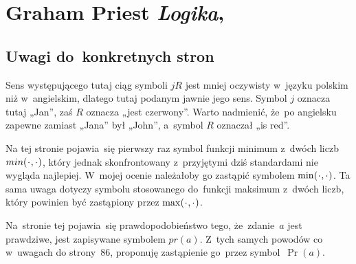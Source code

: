 \documentclass[a4paper,11pt]{article}
\numberwithin{equation}{section}
\begin{document}
\VerSpaceSix












\section{Graham Priest \textit{Logika},
  \parencite{Priest-Logika-Pub-2023}}



\subsection{Uwagi do~konkretnych stron}


\noindent
{} Sens występującego tutaj ciąg symboli $jR$ jest
mniej oczywisty w~języku polskim niż w~angielskim, dlatego tutaj podanym
jawnie jego sens. Symbol $j$ oznacza tutaj „Jan”, zaś $R$ oznacza „jest
czerwony”. Warto nadmienić, że~po angielsku zapewne zamiast „Jana” był
„John”, a~symbol $R$ oznaczał „is red”.

\VerSpaceFour





\noindent
{} Na tej stronie pojawia~się pierwszy raz symbol funkcji minimum
z~dwóch liczb
$min( \hspace{0.05em} \cdot \hspace{0.05em} , \cdot \hspace{0.05em} )$, który jednak
skonfrontowany z~przyjętymi dziś standardami nie wygląda najlepiej.
W~mojej ocenie należałoby go zastąpić symbolem
$\min( \hspace{0.05em} \cdot \hspace{0.05em} , \cdot \hspace{0.05em} )$. Ta sama uwaga dotyczy
symbolu stosowanego do~funkcji maksimum z~dwóch liczb, który powinien być
zastąpiony przez $\max( \hspace{0.05em} \cdot \hspace{0.05em} , \cdot \hspace{0.05em} )$.

\VerSpaceFour





\noindent
{} Na~stronie tej pojawia~się prawdopodobieństwo tego, że~zdanie~$a$
jest prawdziwe, jest zapisywane symbolem $pr( a )$. Z~tych samych powodów
co w~uwagach do strony~86, proponuję zastąpienie go~przez
symbol~$\Pr( a )$.

\VerSpaceFour
\end{document}
